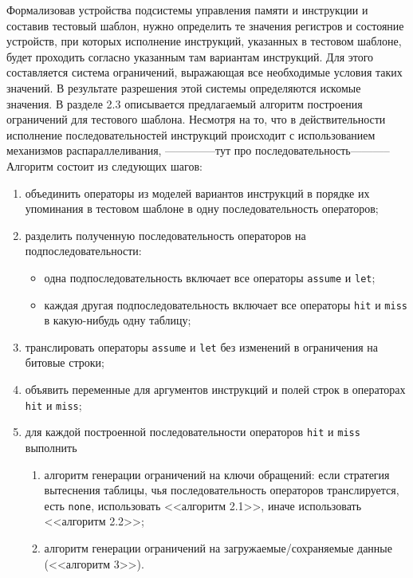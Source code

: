 \documentclass[14pt,autoref,href
,facsimile
]{disser}
\begin{document}
Формализовав устройства подсистемы управления памяти и инструкции и составив тестовый шаблон, нужно определить те значения регистров и состояние устройств, при которых исполнение инструкций, указанных в тестовом шаблоне, будет проходить согласно указанным там вариантам инструкций. Для этого составляется система ограничений, выражающая все необходимые условия таких значений. В результате разрешения этой системы определяются искомые значения. В разделе 2.3 описывается предлагаемый алгоритм построения ограничений для тестового шаблона. Несмотря на то, что в действительности исполнение последовательностей инструкций происходит с использованием механизмов распараллеливания,  --------------тут про последовательность----------- Алгоритм состоит из следующих шагов:
\begin{enumerate}
    \item объединить операторы из моделей вариантов инструкций в порядке их упоминания в тестовом шаблоне в одну последовательность операторов;
    \item разделить полученную последовательность операторов на
подпоследовательности:
            \begin{itemize}
                \item одна подпоследовательность включает все операторы \texttt{assume} и \texttt{let};
                \item каждая другая подпоследовательность включает все операторы
\texttt{hit} и \texttt{miss} в какую-нибудь одну таблицу;
            \end{itemize}
    \item транслировать операторы \texttt{assume} и \texttt{let} без изменений в
ограничения на битовые строки;
    \item объявить переменные для аргументов инструкций и полей строк в
операторах \texttt{hit} и \texttt{miss};
    \item для каждой построенной последовательности операторов \texttt{hit} и \texttt{miss} выполнить
            \begin{enumerate}
                \item алгоритм генерации ограничений на ключи обращений: если стратегия вытеснения таблицы, чья последовательность операторов транслируется,  есть \texttt{none}, использовать <<алгоритм 2.1>>, иначе использовать <<алгоритм 2.2>>;
                \item алгоритм генерации ограничений на загружаемые/сохраняемые
данные (<<алгоритм 3>>).
            \end{enumerate}
\end{enumerate}
\end{document}
